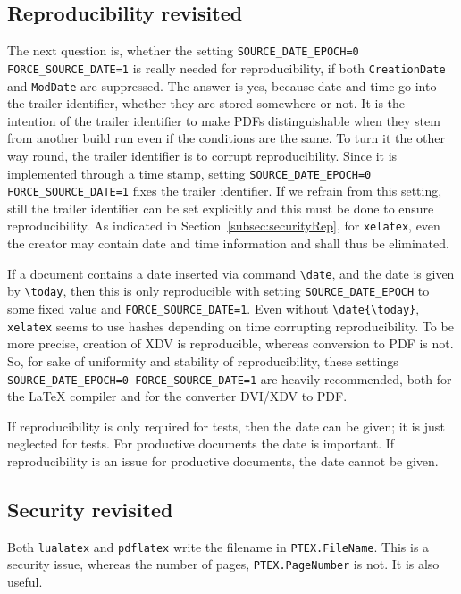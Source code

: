 \documentclass[a4paper, english]{article}%
\newcommand{\pdflatex}{\texttt{pdflatex}}
\newcommand{\lualatex}{\texttt{lualatex}}
\newcommand{\xelatex}{\texttt{xelatex}}
\newcommand{\cmd}[1]{\texttt{\textbackslash#1}}
\begin{document}
\subsection{Reproducibility revisited}\label{subsec:reprod2}

The next question is, 
whether the setting \texttt{SOURCE\_DATE\_EPOCH=0 FORCE\_SOURCE\_DATE=1} 
is really needed for reproducibility, 
if both \texttt{CreationDate} and \texttt{ModDate} are suppressed. 
The answer is yes, because date and time go into the trailer identifier, 
whether they are stored somewhere or not. 
It is the intention of the trailer identifier to make PDFs distinguishable 
when they stem from another build run even if the conditions are the same. 
To turn it the other way round, the trailer identifier 
is to corrupt reproducibility. 
Since it is implemented through a time stamp, 
setting \texttt{SOURCE\_DATE\_EPOCH=0 FORCE\_SOURCE\_DATE=1} 
fixes the trailer identifier. 
If we refrain from this setting, 
still the trailer identifier can be set explicitly 
and this must be done to ensure reproducibility. 
As indicated in Section~\ref{subsec:securityRep}, 
for \xelatex, even the creator may contain date and time information 
and shall thus be eliminated. 

If a document contains a date inserted via command \cmd{date}, 
and the date is given by \cmd{today}, 
then this is only reproducible 
with setting \texttt{SOURCE\_DATE\_EPOCH} to some fixed value and \texttt{FORCE\_SOURCE\_DATE=1}. 
Even without \cmd{date\{\cmd{today}\}}, \xelatex{} seems to use hashes depending on time 
corrupting reproducibility. 
To be more precise, creation of XDV is reproducible, 
whereas conversion to PDF is not. 
So, for sake of uniformity and stability of reproducibility, 
these settings \texttt{SOURCE\_DATE\_EPOCH=0 FORCE\_SOURCE\_DATE=1} are heavily recommended, 
both for the \LaTeX{} compiler and for the converter DVI/XDV to PDF\@. 

If reproducibility is only required for tests, 
then the date can be given; it is just neglected for tests. 
For productive documents the date is important. 
If reproducibility is an issue for productive documents, the date cannot be given. 

\subsection{Security revisited}\label{subsec:security2}

Both \lualatex{} and \pdflatex{} write the filename in \texttt{PTEX.FileName}. 
This is a security issue, 
whereas the number of pages, \texttt{PTEX.PageNumber} is not. 
It is also useful. 
\end{document}
